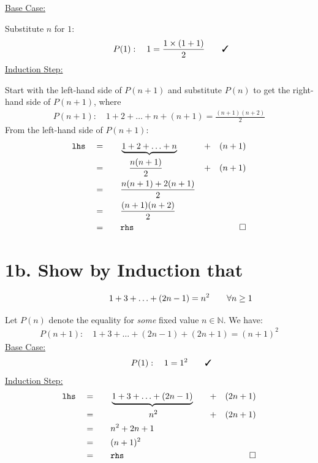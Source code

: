 \documentclass[12pt]{article}
\begin{document}
\underline{Base Case:} 

Substitute $n$ for $1$:
\begin{align*}
P(1): \quad
  1 = \frac{1 \times (1+1)}{2} \mathrlap{\qquad \cmark}
\end{align*}
\underline{Induction Step:} 

Start with the left-hand side of $P(n+1)$ and substitute $P(n)$ to get the right-hand side of $P(n+1)$, where
\begin{align*}
P(n+1): \quad
 1 + 2 + \ldots + n + (n+1) = \frac{(n+1)(n+2)}{2}
\end{align*}
From the left-hand side of $P(n+1)$:
\begin{alignat*}{4}
\texttt{lhs} \quad
 &=& \quad & \underbrace{1 + 2 + \ldots + n} \quad &+\quad (n+1) \\
 &=& \quad & \quad \frac{n(n+1)}{2} \quad &+\quad (n+1)  \\
 &=& \quad & \frac{n(n+1)+2(n+1)}{2} \\
 &=& \quad & \frac{(n+1)(n+2)}{2} \\
 &=& \quad & \texttt{rhs} & \qed
\end{alignat*}


\clearpage

\section*{1b. Show by Induction that}
\begin{question}
  \begin{align*}
  1 + 3 + \ldots + (2n-1) = n^{2} \mathrlap{\qquad \forall n\geq 1}
  \end{align*}
\end{question}
Let $P(n)$ denote	the equality for \textit{some} fixed value $n\in\mathbb{N}$. We have:
\begin{align*}
P(n+1): \quad
  1 + 3 + \ldots + (2n-1) + (2n+1) = (n+1)^{2}
\end{align*}
\underline{Base Case:}
\begin{align*}
P(1): \quad
  1 = 1^{2} \mathrlap{\qquad \cmark}
\end{align*}
\underline{Induction Step:}
\begin{alignat*}{4}
\texttt{lhs} \quad
 &=& \quad &\underbrace{1 + 3 + \ldots + (2n-1)} \quad &+ \quad (2n+1) \\
 &=& \quad &\makebox[10em]{$n^{2}$} &+ \quad (2n+1)  \\
 &=& \quad & n^{2}+ 2n + 1 \\
 &=& \quad & (n + 1)^{2} \\
 &=& \quad & \texttt{rhs} & \qed 
\end{alignat*}
\end{document}
